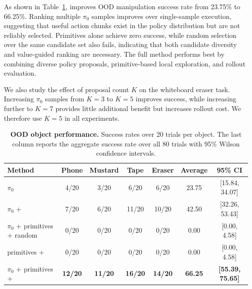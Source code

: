 As shown in Table~\ref{tab:ood-performance}, \coolname{} improves OOD manipulation success rate from 23.75\% to 66.25\%. Ranking multiple $\pi_0$ samples improves over single-sample execution, suggesting that useful action chunks exist in the policy distribution but are not reliably selected. Primitives alone achieve zero success, while random selection over the same candidate set also fails, indicating that both candidate diversity and value-guided ranking are necessary. The full method performs best by combining diverse policy proposals, primitive-based local exploration, and rollout evaluation.

We also study the effect of proposal count $K$ on the whiteboard eraser task. Increasing $\pi_0$ samples from $K{=}3$ to $K{=}5$ improves success, while increasing further to $K{=}7$ provides little additional benefit but increases rollout cost. We therefore use $K{=}5$ in all experiments.


\begin{table}[h]
\caption{\textbf{OOD object performance.}
Success rates over 20 trials per object. The last column reports the aggregate success rate over all 80 trials with 95\% Wilson confidence intervals.}
\label{tab:ood-performance}

\centering
\scriptsize
\setlength{\tabcolsep}{3.0pt}
\renewcommand{\arraystretch}{0.82}

\begin{tabular}{lcccccc}
\toprule
Method & Phone & Mustard & Tape & Eraser & Average & 95\% CI \\
\midrule
$\pi_0$
& 4/20 & 3/20 & 6/20 & 6/20 & 23.75 & [15.84, 34.07] \\

$\pi_0$ + \coolname{}
& 7/20 & 6/20 & 11/20 & 10/20 & 42.50 & [32.26, 53.43] \\

$\pi_0$ + primitives + random
& 0/20 & 0/20 & 0/20 & 0/20 & 0.00 & [0.00, 4.58] \\

primitives + \coolname{}
& 0/20 & 0/20 & 0/20 & 0/20 & 0.00 & [0.00, 4.58] \\

\midrule
$\pi_0$ + primitives + \coolname{}
& \textbf{12/20}
& \textbf{11/20}
& \textbf{16/20}
& \textbf{14/20}
& \textbf{66.25}
& \textbf{[55.39, 75.65]} \\
\bottomrule
\end{tabular}

\vspace{-6pt}
\end{table}




